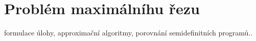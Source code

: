 \chapter{Problém maximálníhu řezu}

formulace úlohy, approximační algoritmy, porovnání semidefinitních programů..